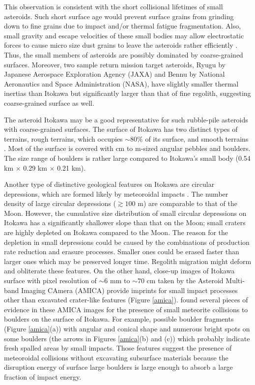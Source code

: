 \documentclass[3p,authoryear]{elsarticle}
\begin{document}
This observation is consistent with the short collisional lifetimes of small asteroids. 
Such short surface age would prevent surface grains from grinding down to fine grains due to impact and/or thermal fatigue fragmentation.
Also, small gravity and escape velocities of these small bodies may allow electrostatic forces to cause micro size dust grains to leave the asteroids rather efficiently \citep{lee1996,hartzell2011,nagao2011}.
Thus, the small members of asteroids are possibly dominated by coarse-grained surfaces.
Moreover, two sample return mission target asteroids, Ryugu by Japanese Aerospace Exploration Agency (JAXA) and Bennu by National Aeronautics
and Space Administration (NASA), have slightly smaller thermal inertias \citep{emery2014, hasegawa2008} than Itokawa but significantly larger than
that of fine regolith, suggesting coarse-grained surface as well.

The asteroid Itokawa may be a good representative for such rubble-pile asteroids with coarse-grained surfaces.
The surface of Itokawa has two distinct types of terrains, rough terrains, which occupies $\sim 80\%$ of its surface, and smooth terrains \citep{saito2006}.
Most of the surface is covered with cm to m-sized angular pebbles and boulders. The size range of boulders is rather large compared to Itokawa's small body (0.54 km $\times$ 0.29 km $\times$ 0.21 km).

Another type of distinctive geological features on Itokawa are circular depressions, which are formed likely by meteoroidal impacts \citep{hirata2009}.
The number density of large circular depressions ($\gtrsim 100$ m) are comparable to that of the Moon.
However, the cumulative size distribution of small circular depressions on Itokawa has a significantly shallower slope than that on the Moon;
small craters are highly depleted on Itokawa compared to the Moon.
The reason for the depletion in small depressions could be caused by the combinations of production rate reduction and erasure processes.
Smaller ones could be erased faster than larger ones which may be preserved longer time. Regolith migration \citep{miyamoto2007, tancredi2015}
might deform and obliterate these features.
On the other hand, close-up images of Itokawa surface with pixel resolution of $\sim 6$ mm to $\sim70$ cm taken by the Asteroid Multi-band Imaging
CAmera (AMICA) provide imprints for small impact processes other than excavated crater-like features (Figure \ref{amica}). \citet{nakamura2008} found
several pieces of evidence in these AMICA images for the presence of small meteorite collisions to boulders on the surface of Itokawa.
For example, possible boulder fragments (Figure \ref{amica}(a)) with angular and conical shape and numerous bright spots  on some boulders (the arrows in Figures \ref{amica}(b) and (c)) which probably indicate fresh spalled areas by small impacts.
Those features suggest the presence of meteoroidal collisions without excavating subsurface materials because the disruption energy of surface large boulders is large enough to absorb a large fraction of impact energy.
\end{document}

